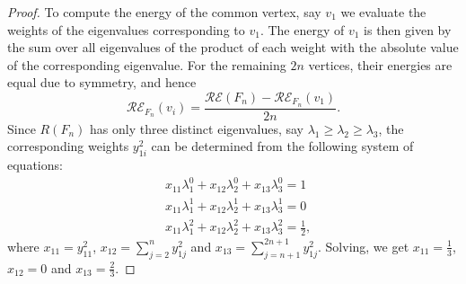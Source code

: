 \documentclass[10pt,a4paper]{amsart}
\begin{document}
\begin{proof}
To compute the energy of the common vertex, say $v_1$ we evaluate the weights of the eigenvalues corresponding to $v_1$. The energy of $v_1$ is then given by the sum over all eigenvalues of the product of each weight with the absolute value of the corresponding eigenvalue. For the remaining $2n$ vertices, their energies are equal due to symmetry, and hence $$\mathcal{RE}_{F_n}(v_i)=\frac{\mathcal{RE}(F_n)-\mathcal{RE}_{F_n}(v_1)}{2n}.$$
Since $R(F_n)$ has only three distinct eigenvalues, say $\lambda_1\geq\lambda_2\geq\lambda_3$, the corresponding weights $y^2_{1i}$ can be determined from the following system of equations:
\begin{align*}
&x_{11}\lambda^0_1+x_{12}\lambda^0_2+x_{13}\lambda^0_3=1\\
&x_{11}\lambda^1_1+x_{12}\lambda^1_2+x_{13}\lambda^1_3=0\\
&x_{11}\lambda^2_1+x_{12}\lambda^2_2+x_{13}\lambda^2_3=\frac{1}{2},
\end{align*}
where $x_{11}=y_{11}^2$, $x_{12}=\sum\limits_{j=2}^{n}y_{1j}^2$ and $x_{13}=\sum\limits_{j=n+1}^{2n+1}y_{1j}^2$. Solving, we get $x_{11}=\frac{1}{3}$, $x_{12}=0$ and $x_{13}=\frac{2}{3}$.
\end{proof}
\end{document}

